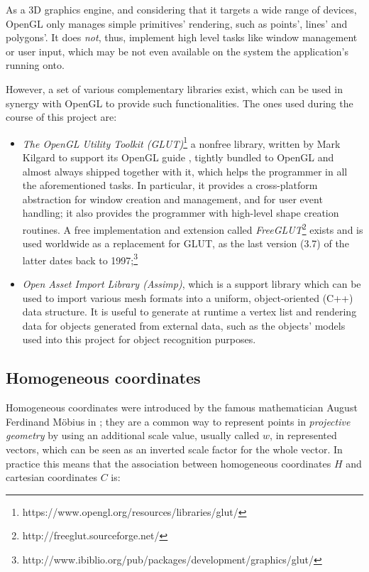 As a 3D graphics engine, and considering that it targets a wide range of devices, OpenGL only manages simple primitives' rendering, such
as points', lines' and polygons'. It does \emph{not}, thus, implement
high level tasks like window management or user input, which may be not even
available on the system the application's running onto.

However, a set of various complementary libraries exist, which can be used in
synergy with OpenGL to provide such functionalities. The ones used during the
course of this project are:

\begin{itemize}
  \item{\emph{The OpenGL Utility Toolkit
      (\emph{GLUT})}\footnote{https://www.opengl.org/resources/libraries/glut/} a
      nonfree library, written by Mark Kilgard to support its OpenGL guide
      \cite{opengl-book}, tightly bundled to OpenGL and
      almost always shipped together with it, which helps the programmer in all the
      aforementioned tasks. In particular, it provides a cross-platform abstraction
      for window creation and management, and for user event handling; it also
      provides the programmer with high-level shape creation routines. A free
      implementation and extension called
      \emph{FreeGLUT}\footnote{http://freeglut.sourceforge.net/} exists and is used
      worldwide as a replacement for GLUT, as the last version (3.7) of the latter dates
      back to
    1997;\footnote{http://www.ibiblio.org/pub/packages/development/graphics/glut/}}

  \item{
      \emph{Open Asset Import Library (\emph{Assimp})}, which is a support library which
      can be used to import various mesh formats into a uniform, object-oriented (C++)
      data structure. It is useful to generate at runtime a vertex list and rendering
      data for objects
      generated from external data, such as the objects' models used into this project
      for object recognition purposes.
    }
\end{itemize}
\subsection{Homogeneous coordinates} \label{sec:homogeneous-coordinates}
Homogeneous coordinates were introduced by the famous mathematician August Ferdinand Möbius in
\cite{homogeneous-coordinates}; they are a common way to represent points in
\emph{projective geometry} by using an additional scale value, usually called
$w$, in represented
vectors, which can be seen as an inverted scale factor for the whole vector. In
practice this means that the association between homogeneous coordinates $H$ and
cartesian coordinates $C$ is:


